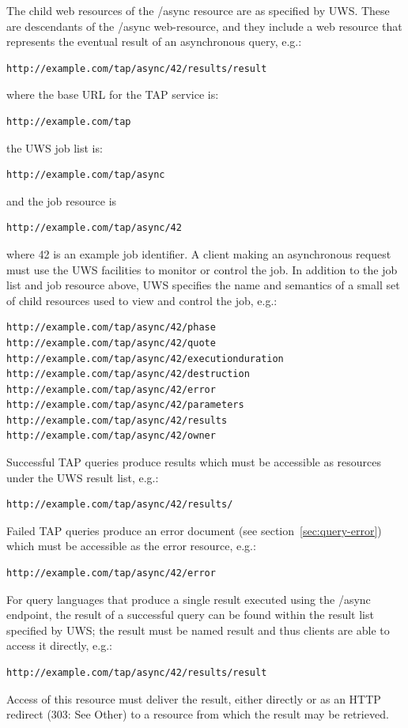 \documentclass[11pt,letter]{ivoa}
\begin{document}
The child web resources of the /async resource are as specified by UWS. These 
are descendants of the /async web-resource, and they include a web resource that 
represents the eventual result of an asynchronous query, e.g.:
\begin{verbatim}
http://example.com/tap/async/42/results/result
\end{verbatim}
where the base URL for the TAP service is:
\begin{verbatim}
http://example.com/tap
\end{verbatim}
the UWS job list is:
\begin{verbatim}
http://example.com/tap/async
\end{verbatim}
and the job resource is
\begin{verbatim}
http://example.com/tap/async/42
\end{verbatim}
where 42 is an example job identifier. A client making an asynchronous request 
must use 
the UWS facilities to monitor or control the job. In addition to the job list 
and job resource above, UWS specifies the name and semantics of a small set 
of child resources used to view and control the job, e.g.:
\begin{verbatim}
http://example.com/tap/async/42/phase
http://example.com/tap/async/42/quote
http://example.com/tap/async/42/executionduration
http://example.com/tap/async/42/destruction
http://example.com/tap/async/42/error
http://example.com/tap/async/42/parameters
http://example.com/tap/async/42/results
http://example.com/tap/async/42/owner
\end{verbatim}
Successful TAP queries produce results which must be accessible as  resources 
under the UWS result list, e.g.:
\begin{verbatim}
http://example.com/tap/async/42/results/
\end{verbatim}
Failed TAP queries produce an error document (see section~\ref{sec:query-error}) which must be accessible 
as the error resource, e.g.:
\begin{verbatim}
http://example.com/tap/async/42/error
\end{verbatim}
For query languages that produce a single result executed using the /async 
endpoint, the result of a successful query can be found within the result list 
specified by UWS; the result must be named result and thus 
clients are able to access it directly, e.g.:
\begin{verbatim}
http://example.com/tap/async/42/results/result
\end{verbatim}
Access of this resource must deliver the result, either directly or as an HTTP 
redirect (303: See Other) to a resource from which the result may be retrieved.
\end{document}
